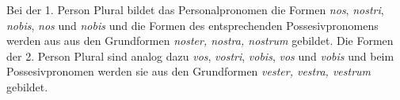 Bei der 1. Person Plural bildet das Personalpronomen die Formen \textit{nos}, \textit{nostri}, \textit{nobis}, \textit{nos} und \textit{nobis} und die Formen des entsprechenden Possesivpronomens werden aus aus den Grundformen \textit{noster, nostra, nostrum} gebildet. Die Formen der 2. Person Plural sind analog dazu \textit{vos}, \textit{vostri}, \textit{vobis}, \textit{vos} und \textit{vobis} und beim Possesivpronomen werden sie aus den Grundformen \textit{vester, vestra, vestrum} gebildet. \par
